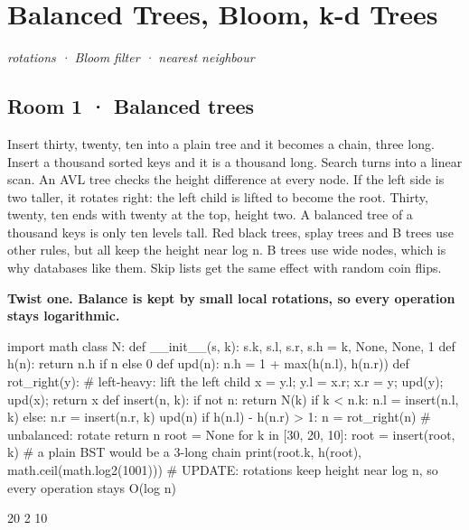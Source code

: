 \documentclass[11pt,a4paper]{report}
\begin{document}
\chapter{Balanced Trees, Bloom, k-d Trees}
\textit{rotations · Bloom filter · nearest neighbour}
\section*{Room 1 · Balanced trees}
Insert thirty, twenty, ten into a plain tree and it becomes a chain, three long. Insert a thousand sorted keys and it is a thousand long. Search turns into a linear scan. An AVL tree checks the height difference at every node. If the left side is two taller, it rotates right: the left child is lifted to become the root. Thirty, twenty, ten ends with twenty at the top, height two. A balanced tree of a thousand keys is only ten levels tall. Red black trees, splay trees and B trees use other rules, but all keep the height near log n. B trees use wide nodes, which is why databases like them. Skip lists get the same effect with random coin flips.
\begin{tcolorbox}[colback=yellow!12,colframe=orange!70!black,boxrule=0.4pt,left=4pt,right=4pt,top=2pt,bottom=2pt]\textbf{Twist one. Balance is kept by small local rotations, so every operation stays logarithmic.}\end{tcolorbox}
\begin{Code}
import math
class N:
    def __init__(s, k): s.k, s.l, s.r, s.h = k, None, None, 1
def h(n): return n.h if n else 0
def upd(n): n.h = 1 + max(h(n.l), h(n.r))
def rot_right(y):                           # left-heavy: lift the left child
    x = y.l; y.l = x.r; x.r = y; upd(y); upd(x); return x
def insert(n, k):
    if not n: return N(k)
    if k < n.k: n.l = insert(n.l, k)
    else: n.r = insert(n.r, k)
    upd(n)
    if h(n.l) - h(n.r) > 1: n = rot_right(n)     # unbalanced: rotate
    return n
root = None
for k in [30, 20, 10]: root = insert(root, k)    # a plain BST would be a 3-long chain
print(root.k, h(root), math.ceil(math.log2(1001)))
# UPDATE: rotations keep height near log n, so every operation stays O(log n)
\end{Code}
\begin{Out}
20 2 10
\end{Out}
\end{document}
